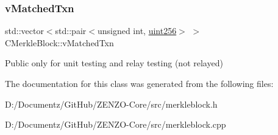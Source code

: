\subsubsection{\texorpdfstring{vMatchedTxn}{vMatchedTxn}}
{\footnotesize\ttfamily std\+::vector$<$std\+::pair$<$unsigned int, \mbox{\hyperlink{classuint256}{uint256}}$>$ $>$ C\+Merkle\+Block\+::v\+Matched\+Txn}

Public only for unit testing and relay testing (not relayed) 

The documentation for this class was generated from the following files\+:\begin{DoxyCompactItemize}
\item 
D\+:/\+Documentz/\+Git\+Hub/\+Z\+E\+N\+Z\+O-\/\+Core/src/merkleblock.\+h\item 
D\+:/\+Documentz/\+Git\+Hub/\+Z\+E\+N\+Z\+O-\/\+Core/src/merkleblock.\+cpp\end{DoxyCompactItemize}
